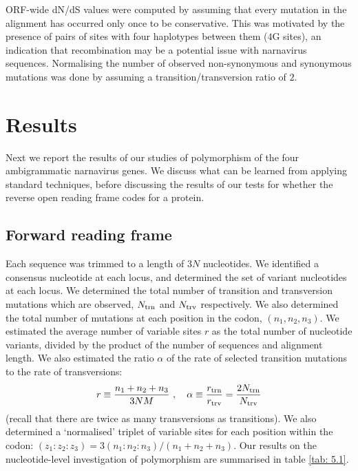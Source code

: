 \documentclass[unnumsec,webpdf,contemporary,large,namedate]{oup-authoring-template}%
\theoremstyle{thmstyleone}%
\theoremstyle{thmstyletwo}%
\theoremstyle{thmstylethree}%
\begin{document}
ORF-wide dN/dS values were computed by assuming that every mutation in the alignment has occurred only once to be conservative. This was motivated by the presence of pairs of sites with four haplotypes between them ($4$G sites), an indication that recombination may be a potential issue with narnavirus sequences.
Normalising the number of observed non-synonymous and synonymous mutations was done by assuming a transition/transversion ratio of $2$.


\section{Results}
\label{sec: 5}

Next we report the results of our studies of polymorphism of the four ambigrammatic narnavirus genes.
We discuss what can be learned from applying standard techniques, before discussing
the results of our tests for whether the reverse open reading frame codes for a protein.

\subsection{Forward reading frame}
\label{sec: 5.1}

Each sequence was trimmed to a length of $3N$ nucleotides. We identified a consensus
nucleotide at each locus, and determined the set of variant nucleotides at each locus.
We determined the total number of transition and transversion mutations which are observed,
$N_{\rm trn}$ and $N_{\rm trv}$ respectively. We also determined the total number
of mutations at each position in the codon, $(n_1,n_2,n_3)$.
We estimated the average number of variable sites $r$ as the total number of nucleotide variants,
divided by the product of the number of sequences and alignment length. We also
estimated the ratio $\alpha$ of the rate of selected transition mutations to the rate of transversions:
%
\begin{equation}
\label{eq: 5.1}
r\equiv \frac{n_1+n_2+n_3}{3NM}
\ ,\ \ \
\alpha\equiv \frac{r_{\rm trn}}{r_{\rm trv}}=\frac{2N_{\rm trn}}{N_{\rm trv}}
\end{equation}
%
(recall that there are twice as many transversions as transitions). We also determined a \lq normalised'
triplet of variable sites for each position within the codon: $(z_1:z_2:z_3)=3(n_1:n_2:n_3)/(n_1+n_2+n_3)$.
Our results on the nucleotide-level
investigation of polymorphism are summarised in table \ref{tab: 5.1}.
\end{document}
